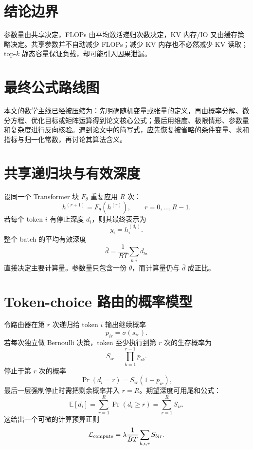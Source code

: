 \documentclass[UTF8,12pt,a4paper,fontset=none]{ctexart}
\numberwithin{equation}{section}
\newcommand{\E}{\mathbb{E}}
\newcommand{\Loss}{\mathcal{L}}
\begin{document}
\section{结论边界}
\begin{criticalbox}[动态深度的三个成本不能混为一谈]
参数量由共享决定，FLOPs 由平均激活递归次数决定，KV 内存/IO 又由缓存策略决定。共享参数并不自动减少 FLOPs；减少 KV 内存也不必然减少 KV 读取；top-$k$ 静态容量保证负载，却可能引入因果泄漏。
\end{criticalbox}
\section{最终公式路线图}
\begin{keybox}[阅读完成后应掌握]
本文的数学主线已经被压缩为：先明确随机变量或张量的定义，再由概率分解、微分方程、优化目标或矩阵运算得到论文核心公式；最后用维度、极限情形、参数量和复杂度进行反向核验。遇到论文中的简写式，应先恢复被省略的条件变量、求和指标与归一化常数，再讨论其算法含义。
\end{keybox}
\clearpage
\section{共享递归块与有效深度}
设同一个 Transformer 块 $F_\theta$ 重复应用 $R$ 次：
\begin{equation}
 h^{(r+1)}=F_\theta(h^{(r)}),\qquad r=0,\ldots,R-1.
\end{equation}
若每个 token $i$ 有停止深度 $d_i$，则其最终表示为
\begin{equation}
 y_i=h_i^{(d_i)}.
\end{equation}
整个 batch 的平均有效深度
\begin{equation}
 \bar d=\frac1{BT}\sum_{b,i}d_{bi}
\end{equation}
直接决定主要计算量。参数量只包含一份 $\theta$，而计算量仍与 $\bar d$ 成正比。

\section{Token-choice 路由的概率模型}
令路由器在第 $r$ 次递归给 token $i$ 输出继续概率
\begin{equation}
 p_{ir}=\sigma(s_{ir}).
\end{equation}
若每次独立做 Bernoulli 决策，token 至少执行到第 $r$ 次的生存概率为
\begin{equation}
 S_{ir}=\prod_{k=1}^{r-1}p_{ik}.
\end{equation}
停止于第 $r$ 次的概率
\begin{equation}
 \Pr(d_i=r)=S_{ir}(1-p_{ir}),
\end{equation}
最后一层强制停止时需把剩余概率并入 $r=R$。期望深度可用尾和公式：
\begin{equation}
 \E[d_i]=\sum_{r=1}^{R}\Pr(d_i\ge r)=\sum_{r=1}^{R}S_{ir}.
\end{equation}
这给出一个可微的计算预算正则
\begin{equation}
 \Loss_{\rm compute}=\lambda\frac1{BT}\sum_{b,i,r}S_{bir}.
\end{equation}
\end{document}
